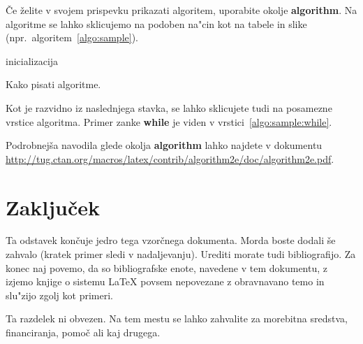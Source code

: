 \documentclass[sigconf]{acmart}
\begin{document}
Če želite v svojem prispevku prikazati algoritem, uporabite okolje
\textbf{algorithm}.  Na algoritme se lahko sklicujemo na podoben na"cin kot na
tabele in slike (npr.\ algoritem~\ref{algo:sample}).

\begin{algorithm}
    \SetAlgoLined
    inicializacija\;
    \caption{Kako pisati algoritme.}
    \label{algo:sample}
\end{algorithm}

Kot je razvidno iz naslednjega stavka, se lahko sklicujete tudi na posamezne
vrstice algoritma.  Primer zanke \textbf{while} je viden v
vrstici~\ref{algo:sample:while}.

Podrobnejša navodila glede okolja
\textbf{algorithm} lahko najdete v dokumentu
\url{http://tug.ctan.org/macros/latex/contrib/algorithm2e/doc/algorithm2e.pdf}.

\section{Zaključek}

Ta odstavek končuje jedro tega vzorčnega dokumenta.  Morda boste dodali še
zahvalo (kratek primer sledi v nadaljevanju).  Urediti morate tudi
bibliografijo.  Za konec naj povemo, da so bibliografske enote, navedene v tem
dokumentu, z izjemo knjige o sistemu \LaTeX{} povsem nepovezane z obravnavano
temo in slu"zijo zgolj kot primeri.

\begin{acks}
    Ta razdelek ni obvezen.  Na tem mestu se lahko zahvalite za morebitna
    sredstva, financiranja, pomoč ali kaj drugega.
\end{acks}



\end{document}
